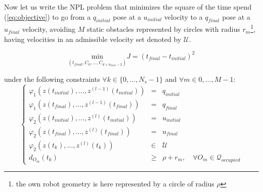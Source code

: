 
Now let us write the NPL problem that minimizes the square of the time spend (\ref{eq:objective}) to go from a $q_{initial}$ pose at a $u_{initial}$ velocity to a $q_{final}$ pose at a $u_{final}$ velocity, avoiding $M$ static obstacles represented by circles with radius $r_m$\footnote{the own robot geometry is here represented by a circle of radius $\rho$}, having velocities in an admissible velocity set denoted by $\mathcal{U}$.

\begin{equation}\label{eq:objective}
	\underset{(t_{final},C_0,\dotsc,C_{d+n_{knot}-2})}{\mathrm{min}} J = (t_{final}-t_{initial})^{2}
\end{equation}

under the following constraints $\forall k \in \{0,\dotsc,N_s -1\}$ and $\forall m \in {0,\dotsc,M-1}$:
\begin{equation}%
\left\lbrace\begin{array}{lcl}
    \varphi_1(z(t_{initial}),\dotsc,z^{(l-1)}(t_{initial})) & = & q_{initial}\\
    \varphi_1(z(t_{final}),\dotsc,z^{(l-1)}(t_{final})) & = & q_{final}\\
    \varphi_2(z(t_{initial}),\dotsc,z^{(l)}(t_{initial})) & = & u_{initial}\\
    \varphi_2(z(t_{final}),\dotsc,z^{(l)}(t_{final}))& = & u_{final}\\
    \varphi_2(z(t_k),\dotsc,z^{(l)}(t_k)) &\in& \mathcal{U}\\
    d_{O_m}(t_k) &\geq& \rho + r_m,\quad \forall O_m \in \mathcal{Q}_{occupied}
\end{array}\right.
\end{equation}

